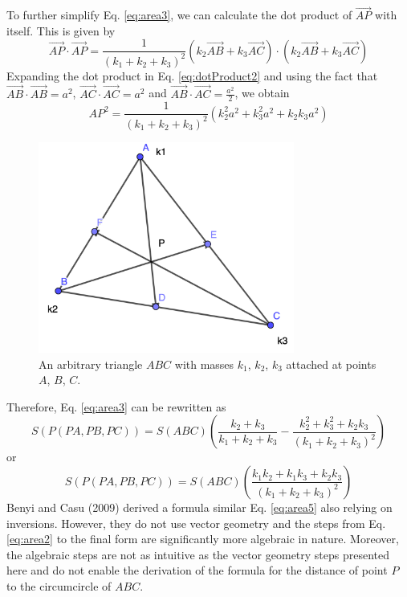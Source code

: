 \documentclass[12pt]{article}
\begin{document}
To further simplify Eq. \ref{eq:area3}, we can calculate the dot product of $\vec{AP}$ with itself.  This is given by
\begin{equation}
\vec{AP}\cdot\vec{AP}=\frac{1}{(k_1+k_2+k_3)^2}(k_2\vec{AB}+k_3\vec{AC})\cdot(k_2\vec{AB}+k_3\vec{AC})
\label{eq:dotProduct2}
\end{equation}
Expanding the dot product in Eq. \ref{eq:dotProduct2} and using the fact that $\vec{AB}\cdot\vec{AB}=a^2$, $\vec{AC}\cdot\vec{AC}=a^2$ and $\vec{AB}\cdot\vec{AC}=\frac{a^2}{2}$, we obtain
\begin{equation}
AP^2=\frac{1}{(k_1+k_2+k_3)^2}(k_2^2a^2+k_3^2a^2+k_2k_3a^2)
\label{eq:dotProduct3}
\end{equation}
\begin{figure}
\centering
\includegraphics[width=0.75\textwidth]{centroid.png}
\caption{An arbitrary triangle $ABC$ with masses $k_1$, $k_2$, $k_3$ attached at points $A$, $B$, $C$.}
\label{fig:centroid}
\end{figure}

Therefore, Eq. \ref{eq:area3} can be rewritten as
\begin{equation}
S(P(PA,PB,PC))=S(ABC)\left(\frac{k_2+k_3}{k_1+k_2+k_3}-\frac{k_2^2+k_3^2+k_2k_3}{(k_1+k_2+k_3)^2}\right)
\label{eq:area4}
\end{equation}
or
\begin{equation}
S(P(PA,PB,PC))=S(ABC)\left(\frac{k_1k_2+k_1k_3+k_2k_3}{(k_1+k_2+k_3)^2}\right)
\label{eq:area5}
\end{equation}
Benyi and Casu (2009) derived a formula similar Eq. \ref{eq:area5} also relying on inversions. However, they do not use vector geometry and the steps from Eq. \ref{eq:area2} to the final form are significantly more algebraic in nature. Moreover, the algebraic steps are not as intuitive as the vector geometry steps presented here and do not enable the derivation of the formula for the distance of point $P$ to the circumcircle of $ABC$.
\end{document}
